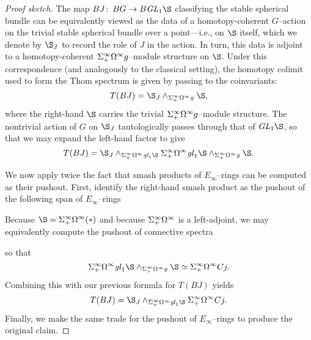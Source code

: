 \begin{proof}[Proof sketch]
The map \(BJ\co BG \to B\GL_1 \S\) classifying the stable spherical bundle can be equivalently viewed as the data of a homotopy-coherent \(G\)--action on the trivial stable spherical bundle over a point---i.e., on \(\S\) itself, which we denote by \(\S_J\) to record the role of \(J\) in the action.  In turn, this data is adjoint to a homotopy-coherent \(\Sigma^\infty_+ \Omega^\infty g\)--module structure on \(\S\).  Under this correspondence (and analogously to the classical setting), the homotopy colimit used to form the Thom spectrum is given by passing to the coinvariants: \[T(BJ) = \S_J \sm_{\Susp^\infty_+ \Omega^\infty g} \S,\] where the right-hand \(\S\) carries the trivial \(\Sigma^\infty_+ \Omega^\infty g\)--module structure.  The nontrivial action of \(G\) on \(\S_J\) tautologically passes through that of \(\GL_1 \S\), so that we may expand the left-hand factor to give \[T(BJ) = \S_J \sm_{\Susp^\infty_+ \Omega^\infty \gl_1 \S} \Susp^\infty_+ \Omega^\infty \gl_1 \S \sm_{\Susp^\infty_+ \Omega^\infty g} \S.\]

We now apply twice the fact that smash products of \(E_\infty\)--rings can be computed as their pushout.  First, identify the right-hand smash product as the pushout of the following span of \(E_\infty\)--rings
\begin{center}
\end{center}
Because \(\S = \Susp^\infty_+ \Omega^\infty(*)\) and because \(\Sigma^\infty_+ \Omega^\infty\) is a left-adjoint, we may equivalently compute the pushout of connective spectra
\begin{center}
\end{center}
so that \[\Susp^\infty_+ \Omega^\infty \gl_1 \S \sm_{\Susp^\infty_+ \Omega^\infty g} \S \simeq \Susp^\infty_+ \Omega^\infty Cj.\]   Combining this with our previous formula for \(T(BJ)\) yields \[T(BJ) = \S_J \sm_{\Susp^\infty_+ \Omega^\infty \gl_1 \S} \Susp^\infty_+ \Omega^\infty Cj.\] Finally, we make the same trade for the pushout of \(E_\infty\)--rings to produce the original claim.
\end{proof}


